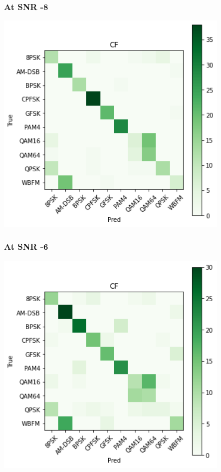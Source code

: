 \documentclass[12pt,a4paper]{article}
\begin{document}
\subsubsection{At SNR -8}
\begin{center}
\includegraphics[width=320pt]{imgs/snrs/snr9.png}
\end{center}
\subsubsection{At SNR -6}
\begin{center}
\includegraphics[width=320pt]{imgs/snrs/snr8.png}
\end{center}
\end{document}
